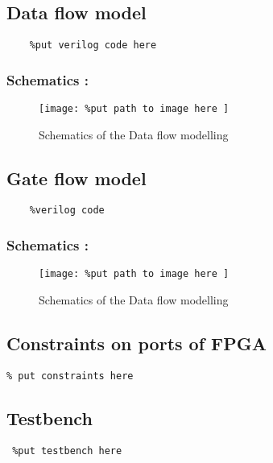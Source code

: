 \section*{}

\subsection*{Data flow model}
\begin{verbatim}
	%put verilog code here
\end{verbatim}
\subsubsection*{Schematics : }
\begin{figure}[H]
    \centering
    \texttt{[image: 
		\%put path to image here
	]}
    \caption{Schematics of the Data flow modelling}
\end{figure}

\subsection*{Gate flow model}
\begin{verbatim}
	%verilog code
\end{verbatim}
\subsubsection*{Schematics : }
\begin{figure}[H]
    \centering
    \texttt{[image: 
		\%put path to image here
	]}
    \caption{Schematics of the Data flow modelling}
\end{figure}

\subsection*{Constraints on ports of FPGA }
\begin{verbatim}
% put constraints here
\end{verbatim}

\subsection*{Testbench}
\begin{verbatim}
 %put testbench here
\end{verbatim}

